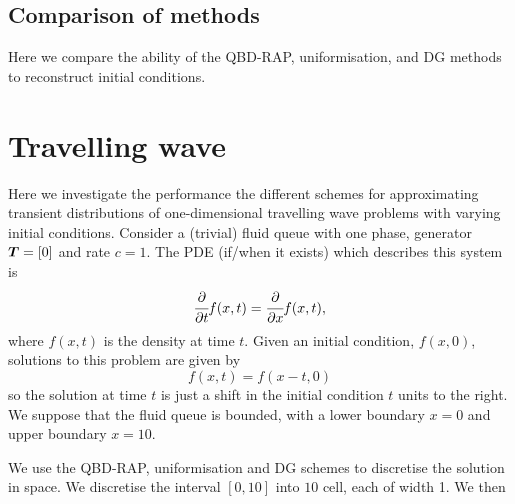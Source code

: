 \subsection{Comparison of methods}
Here we compare the ability of the QBD-RAP, uniformisation, and DG methods to reconstruct initial conditions. 


\section{Travelling wave}
Here we investigate the performance the different schemes for approximating transient distributions of one-dimensional travelling wave problems with varying initial conditions. Consider a (trivial) fluid queue with one phase, generator \(\boldsymbol T=[0]\) and rate \(c=1\). The PDE (if/when it exists) which describes this system is 
\[\cfrac{\partial}{\partial t} f(x,t) = \cfrac{\partial}{\partial x} f(x,t),\]
where \(f(x,t)\) is the density at time \(t\). Given an initial condition, \(f(x,0)\), solutions to this problem are given by 
\[f(x,t) = f(x-t,0)\]
so the solution at time \(t\) is just a shift in the initial condition \(t\) units to the right. We suppose that the fluid queue is bounded, with a lower boundary \(x=0\) and upper boundary \(x=10\). 



We use the QBD-RAP, uniformisation and DG schemes to discretise the solution in space. We discretise the interval \([0,10]\) into \(10\) cell, each of width 1. We then



































